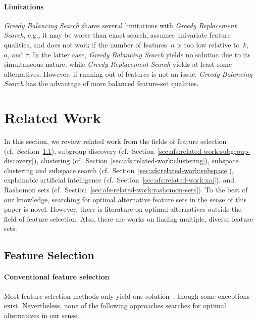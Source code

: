 \documentclass{article}
\theoremstyle{definition}
\begin{document}
\paragraph{Limitations}

\emph{Greedy Balancing Search} shares several limitations with \emph{Greedy Replacement Search}, e.g., it may be worse than exact search, assumes univariate feature qualities, and does not work if the number of features~$n$ is too low relative to~$k$, $a$, and $\tau$.
In the latter case, \emph{Greedy Balancing Search} yields no solution due to its simultaneous nature, while \emph{Greedy Replacement Search} yields at least some alternatives.
However, if running out of features is not an issue, \emph{Greedy Balancing Search} has the advantage of more balanced feature-set qualities.

\section{Related Work}
\label{sec:afs:related-work}

In this section, we review related work from the fields of feature selection (cf.~Section~\ref{sec:afs:related-work:feature-selection}), subgroup discovery (cf.~Section~\ref{sec:afs:related-work:subgroup-discovery}), clustering (cf.~Section~\ref{sec:afs:related-work:clustering}), subspace clustering and subspace search (cf.~Section~\ref{sec:afs:related-work:subspace}), explainable artificial intelligence (cf.~Section~\ref{sec:afs:related-work:xai}),
and Rashomon sets (cf.~Section~\ref{sec:afs-related-work:rashomon-sets}).
To the best of our knowledge, searching for optimal alternative feature sets in the sense of this paper is novel.
However, there is literature on optimal alternatives outside the field of feature selection.
Also, there are works on finding multiple, diverse feature sets.

\subsection{Feature Selection}
\label{sec:afs:related-work:feature-selection}

\paragraph{Conventional feature selection}

Most feature-selection methods only yield one solution~\cite{borboudakis2021extending}, though some exceptions exist.
Nevertheless, none of the following approaches searches for optimal alternatives in our sense.
\end{document}

